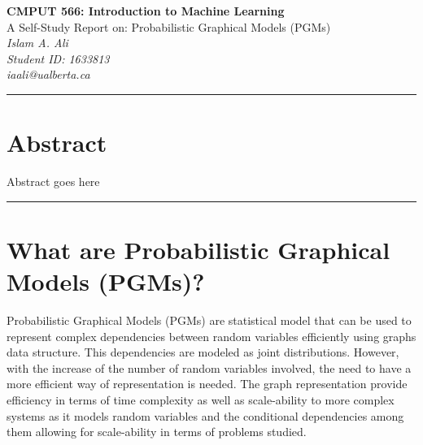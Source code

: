 \documentclass{article}
\begin{document}
\begin{center}
{\bf CMPUT 566: Introduction to Machine Learning}  \\
{A Self-Study Report on: Probabilistic Graphical Models (PGMs)} \\
\vspace{.1in}
{\em Islam A. Ali}\\
{\em Student ID: 1633813}\\
{\em iaali@ualberta.ca}\\
\end{center}
\noindent\rule{\textwidth}{1pt}

\section*{Abstract}
Abstract goes here 

\noindent\rule{\textwidth}{1pt}
\section{What are Probabilistic Graphical Models (PGMs)?}
Probabilistic Graphical Models (PGMs) are statistical model that can be used to represent complex dependencies between random variables efficiently using graphs data structure. This dependencies are modeled as joint distributions. However, with the increase of the number of random variables involved, the need to have a more efficient way of representation is needed. The graph representation provide efficiency in terms of time complexity as well as scale-ability to more complex systems as it models random variables and the conditional dependencies among them allowing for scale-ability in terms of problems studied.
\end{document}
